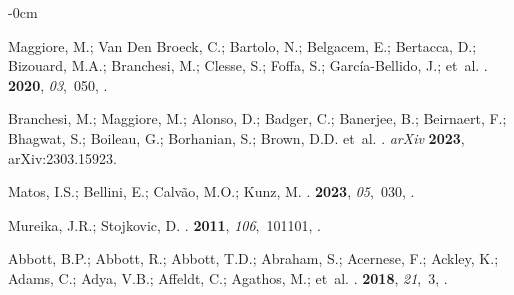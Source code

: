 \documentclass[universe,article,accept,moreauthors,pdftex]{Definitions/mdpi}
\begin{document}
\begin{adjustwidth}{-\extralength}{0cm}
\begin{thebibliography}{999}
Maggiore, M.; Van Den Broeck, C.; Bartolo, N.; Belgacem, E.; Bertacca, D.; Bizouard, M.A.; Branchesi, M.; Clesse, S.; Foffa, S.; García-Bellido, J.;   et~al.
.
 {\bf 2020}, {\em 03},~050,
{\href{https://doi.org/10.1088/1475-7516/2020/03/050}{}}.

Branchesi, M.; Maggiore, M.; Alonso, D.; Badger, C.; Banerjee, B.; Beirnaert, F.; Bhagwat, S.; Boileau, G.; Borhanian, S.; Brown, D.D. et~al.
.\emph{ arXiv} {\bf 2023}, arXiv:2303.15923. 

Matos, I.S.; Bellini, E.; Calv\~ao, M.O.; Kunz, M.
.
 {\bf 2023}, {\em 05},~030,
{\href{https://doi.org/10.1088/1475-7516/2023/05/030}{}}.

Mureika, J.R.; Stojkovic, D.
.
 {\bf 2011}, {\em 106},~101101,
{\href{https://doi.org/10.1103/PhysRevLett.106.101101}{}}.

Abbott, B.P.; Abbott, R.; Abbott, T.D.; Abraham, S.; Acernese, F.; Ackley, K.; Adams, C.; Adya, V.B.; Affeldt, C.; Agathos, M.;   et~al.
.
 {\bf 2018}, {\em 21},~3,
{\href{https://doi.org/10.1007/s41114-020-00026-9}{}}.


\end{thebibliography}
\end{adjustwidth}
\end{document}
